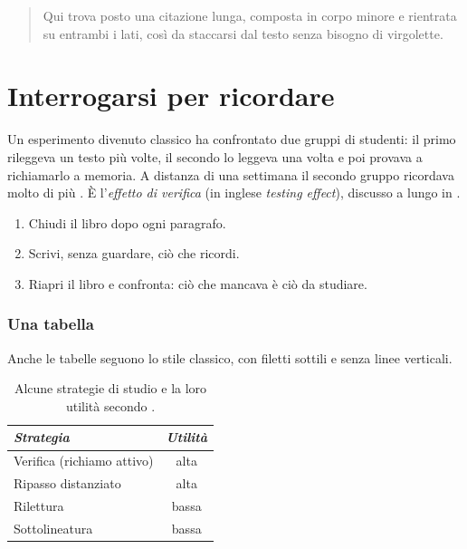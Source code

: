 \begin{quote}
Qui trova posto una citazione lunga, composta in corpo minore e
rientrata su entrambi i lati, così da staccarsi dal testo senza
bisogno di virgolette.
\end{quote}

\asterismo

\section{Interrogarsi per ricordare}

Un esperimento divenuto classico ha confrontato due gruppi di studenti:
il primo rileggeva un testo più volte, il secondo lo leggeva una volta
e poi provava a richiamarlo a memoria. A distanza di una settimana il
secondo gruppo ricordava molto di più \parencite{roediger2006}. È
l'\emph{effetto di verifica} (in inglese \emph{testing effect}),
discusso a lungo in \textcite{brown2014}.

\begin{inpratica}
\begin{enumerate}
  \item Chiudi il libro dopo ogni paragrafo.
  \item Scrivi, senza guardare, ciò che ricordi.
  \item Riapri il libro e confronta: ciò che mancava è ciò da studiare.
\end{enumerate}
\end{inpratica}

\subsubsection{Una tabella} Anche le tabelle seguono lo stile
classico, con filetti sottili e senza linee verticali.

\begin{table}[tbp]
  \centering\small
  \begin{tabular}{@{}lc@{}}
    \toprule
    \textit{Strategia} & \textit{Utilità} \\
    \midrule
    Verifica (richiamo attivo) & alta \\
    Ripasso distanziato       & alta \\
    Rilettura                 & bassa \\
    Sottolineatura            & bassa \\
    \bottomrule
  \end{tabular}
  \caption{Alcune strategie di studio e la loro utilità secondo
    \textcite{dunlosky2013}.}
  \label{tab:modello-strategie}
\end{table}

